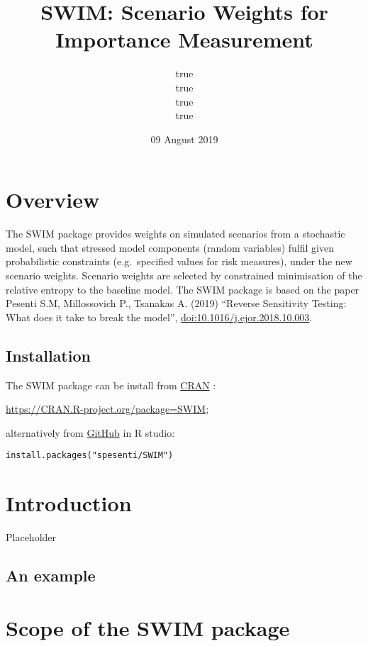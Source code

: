 \documentclass[]{book}
\title{SWIM: Scenario Weights for Importance Measurement}
\author{true \\ true \\ true \\ true}
\date{09 August 2019}
\begin{document}
\maketitle

{
\setcounter{tocdepth}{1}
\tableofcontents
}
\hypertarget{overview}{%
\chapter{Overview}\label{overview}}

The SWIM package provides weights on simulated scenarios from a
stochastic model, such that stressed model components (random variables)
fulfil given probabilistic constraints (e.g.~specified values for risk
measures), under the new scenario weights. Scenario weights are selected
by constrained minimisation of the relative entropy to the baseline
model. The SWIM package is based on the paper Pesenti S.M, Millossovich P., Tsanakas A. (2019) ``Reverse Sensitivity Testing: What does it take to break the model'', \href{https://doi.org/10.1016/j.ejor.2018.10.003}{doi:10.1016/j.ejor.2018.10.003}.

\hypertarget{installation}{%
\section{Installation}\label{installation}}

The SWIM package can be install from \href{https://CRAN.R-project.org/package=SWIM}{CRAN} :

\url{https://CRAN.R-project.org/package=SWIM};

alternatively from \href{https://github.com/spesenti/SWIM}{GitHub} in R studio:

\begin{verbatim}
install.packages("spesenti/SWIM")
\end{verbatim}

\hypertarget{introduction}{%
\chapter{Introduction}\label{introduction}}

Placeholder

\hypertarget{an-example}{%
\section{An example}\label{an-example}}

\hypertarget{scope-of-the-swim-package}{%
\chapter{Scope of the SWIM package}\label{scope-of-the-swim-package}}
\end{document}
